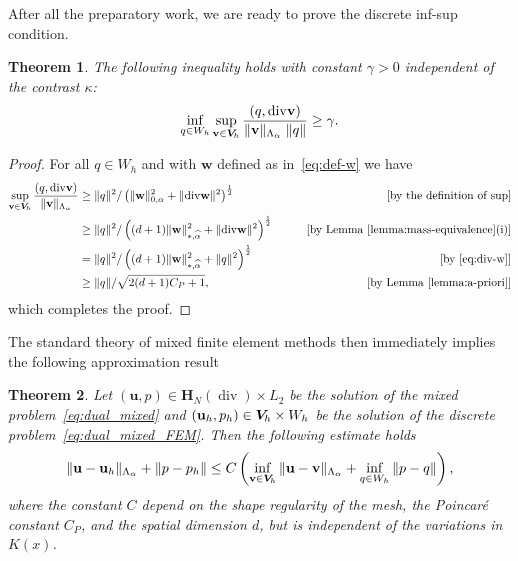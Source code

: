 \documentclass[11pt]{amsart}
\numberwithin{equation}{section}
\newtheorem{theorem}{Theorem}[section]
\theoremstyle{definition}\newtheorem{example}{Example}[section]
\begin{document}
After all the preparatory work, we are ready to prove the discrete
inf-sup condition. 
\begin{theorem}\label{theorem:inf-sup} The following inequality holds
  with constant $\gamma>0$ independent of the contrast $\kappa$:
\begin{equation}
\inf_{q\in W_h}\sup_{{{\mathbf v}}\in {{\boldsymbol V}_{\hspace{-0.2mm}h}}}\frac{(q,{\operatorname{div}}
  {{\mathbf v}})}{\|{{\mathbf v}}\|_{\Lambda_\alpha}\;\|q\|}\ge \gamma.
\end{equation}
\end{theorem}
\begin{proof}
For all $q\in W_h$  and with ${{\mathbf w}}$ defined as in~\eqref{eq:def-w} we have  
\begin{equation*}
\begin{aligned}
  \sup_{{{\mathbf v}}\in {{\boldsymbol V}_{\hspace{-0.2mm}h}}} \frac{(q,{\operatorname{div}} {{\mathbf v}})}{\|{{\mathbf v}}\|_{\Lambda_\alpha}} &
  \ge \|q\|^2 /\left (\|{{\mathbf w}}\|_{0,\alpha}^2+\|{\operatorname{div}} {{\mathbf w}}\|^2
    \right )^\frac12  &\qquad \mbox{[by the definition of $\sup$]}
  \\
  &\ge  \|q\|^2 / \left (  (d+1)\|{{\mathbf w}}\|^2_{*,\widehat{\alpha}}+\|{\operatorname{div}} {{\mathbf w}}\|^2
      \right )^\frac12 &\qquad 
\mbox{[by      Lemma~\ref{lemma:mass-equivalence}(i)]} 
\\
&= \|q\|^2 / \left ( (d+1)\|{{\mathbf w}}\|^2_{*,\widehat{\alpha}}+\|q\|^2 \right )^\frac12
&\qquad \mbox{[by \eqref{eq:div-w}]}\\
&\ge \|q\|/ \sqrt{2(d+1)C_P+1},
& \qquad \mbox{[by Lemma~\ref{lemma:a-priori}]}
\end{aligned}
\end{equation*}
which completes the proof.
\end{proof}
The standard theory of mixed finite element methods then immediately
implies the following approximation result
\begin{theorem}\label{theorem:cea} 
Let $({{\mathbf u}},p)\in {{\boldsymbol H}}_N({\operatorname{div}})\times  L_2$ be the solution of the mixed 
problem~\eqref{eq:dual_mixed} and
  $({{\mathbf u}}_h,p_h)\in {{\boldsymbol V}_{\hspace{-0.2mm}h}}\times W_h$ be the solution of the
  discrete problem~\eqref{eq:dual_mixed_FEM}. Then the following estimate
  holds
\begin{equation}\label{eq:cea}
  \|{{\mathbf u}}-{{\mathbf u}}_h\|_{\Lambda_\alpha} +\|p-p_h\|
\le 
C \left( \inf_{{{\mathbf v}}\in {{\boldsymbol V}_{\hspace{-0.2mm}h}}}\|{{\mathbf u}}-{{\mathbf v}}\|_{\Lambda_\alpha}+
\inf_{q\in W_h}\|p-q\|\right),
\end{equation}
where the constant $C$ 
depend on the shape
regularity of the mesh, the Poincar\'e constant $C_P$, and the spatial dimension $d$, but is
independent of the variations in $K(x)$. 
\end{theorem}
\end{document}
